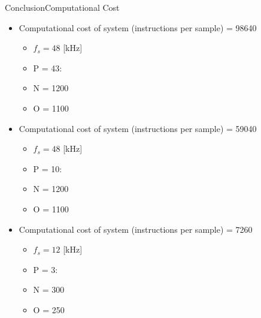 \begin{frame}{Conclusion}{Computational Cost}		
\begin{itemize}
\item Computational cost of system (instructions per sample) = 98640
	\begin{itemize} 
		\item $f_s = 48$ [kHz]
		\item P = 43: 
		\item N = 1200
		\item O = 1100
	\end{itemize}
\item Computational cost of system (instructions per sample) = 59040
	\begin{itemize}
		\item $f_s = 48$ [kHz]
		\item P = 10: 
		\item N = 1200
		\item O = 1100
	\end{itemize}
\item Computational cost of system (instructions per sample) = 7260
	\begin{itemize}
		\item $f_s = 12$ [kHz]
		\item P = 3: 
		\item N = 300
		\item O = 250
	\end{itemize}
\end{itemize}
\end{frame}